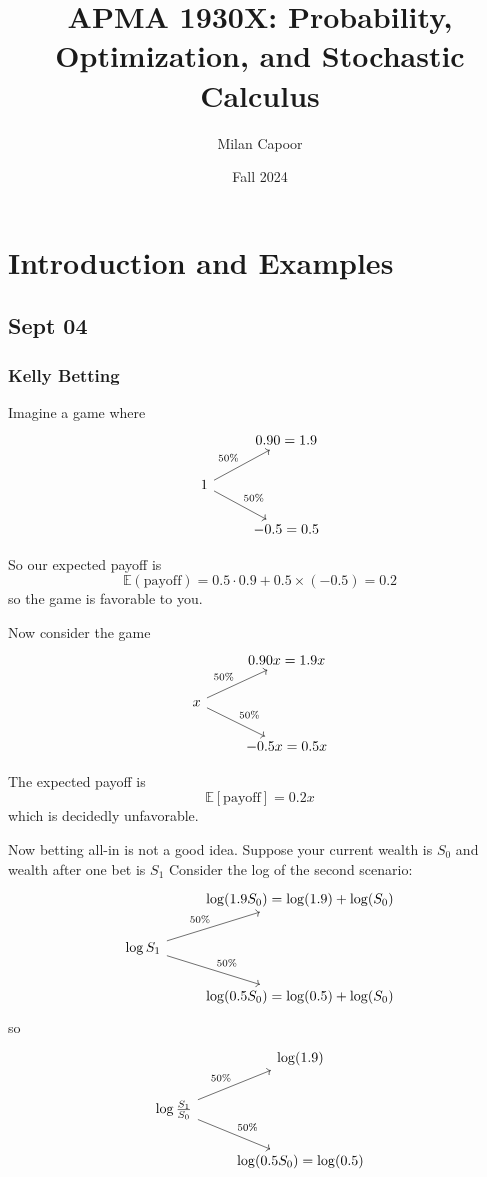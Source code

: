 \documentclass[12pt]{report}
\title{APMA 1930X: Probability, Optimization, and Stochastic Calculus}
\author{Milan Capoor}
\date{Fall 2024}
\newcommand{\E}{\mathbb{E}}
\begin{document}
\maketitle
\chapter{Introduction and Examples}
\section*{Sept 04}
\subsection*{Kelly Betting}
    Imagine a game where 
    \[\begin{tikzcd}
        & 0.90 = 1.9\\ 
        1 \arrow[ur, "50\%"] \arrow[dr, "50\%"]&\\
        & -0.5 = 0.5
    \end{tikzcd}\]  

    So our expected payoff is 
    \[\E(\text{payoff}) = 0.5\cdot 0.9 + 0.5 \times (-0.5) = 0.2\]
    so the game is favorable to you. 

    Now consider the game 
    \[\begin{tikzcd}
        & 0.90x = 1.9x\\ 
        x \arrow["50\%"]{ur} \arrow["50\%"]{dr} &\\
        & -0.5x = 0.5x
    \end{tikzcd}\] 

    The expected payoff is
    \[\E[\text{payoff}] = 0.2x\]
    which is decidedly unfavorable. 

    Now betting all-in is not a good idea. Suppose your current wealth is $S_0$ and wealth after one bet is $S_1$ Consider the log of the second scenario:
    \[\begin{tikzcd}
        & \log(1.9 S_0) = \log(1.9) + \log(S_0)\\ 
        \log S_1 \arrow["50\%"]{ur} \arrow["50\%"]{dr}  &\\
        &  \log(0.5 S_0) = \log(0.5) + \log(S_0)
    \end{tikzcd}\]
    so 
    \[\begin{tikzcd}
        & \log(1.9)\\ 
        \log \frac{S_1}{S_0} \arrow["50\%"]{ur} \arrow["50\%"]{dr}  &\\
        &  \log(0.5 S_0) = \log(0.5)
    \end{tikzcd}\]
\end{document}
